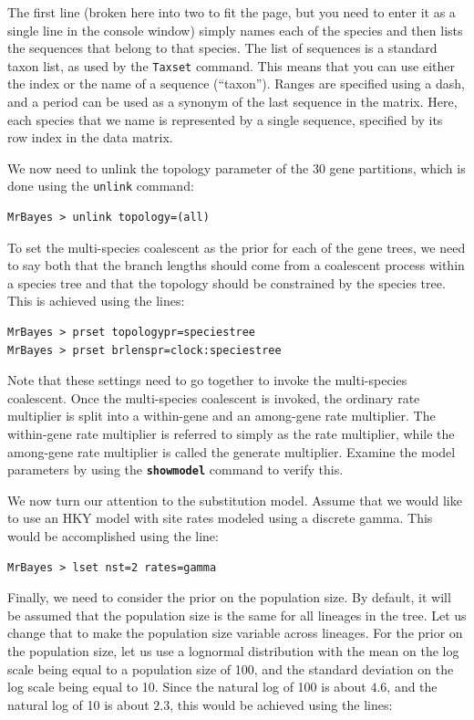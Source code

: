 \documentclass[12pt]{book}
\newcommand{\ttt}[1]{\texttt{#1}}
\newcommand{\tb}[1]{\ttt{\textbf{#1}}}
\begin{document}
The first line (broken here into two to fit the page, but you need to enter it as a single line in
the console window) simply names each of the species and then lists the sequences that belong to
that species. The list of sequences is a standard taxon list, as used by the \ttt{Taxset} command.
This means that you can use either the index or the name of a sequence (``taxon''). Ranges are
specified using a dash, and a period can be used as a synonym of the last sequence in the matrix.
Here, each species that we name is represented by a single sequence, specified by its row index in
the data matrix.

We now need to unlink the topology parameter of the 30 gene partitions, which is done using the
\ttt{unlink} command:

\begin{verbatim}
MrBayes > unlink topology=(all)
\end{verbatim}

To set the multi-species coalescent as the prior for each of the gene trees, we need to say both
that the branch lengths should come from a coalescent process within a species tree and that the
topology should be constrained by the species tree. This is achieved using the lines:

\begin{singlespacing}
\begin{verbatim}
MrBayes > prset topologypr=speciestree
MrBayes > prset brlenspr=clock:speciestree
\end{verbatim}
\end{singlespacing}

Note that these settings need to go together to invoke the multi-species coalescent. Once the
multi-species coalescent is invoked, the ordinary rate multiplier is split into a within-gene and
an among-gene rate multiplier. The within-gene rate multiplier is referred to simply as the rate
multiplier, while the among-gene rate multiplier is called the generate multiplier. Examine the
model parameters by using the \tb{showmodel} command to verify this.

We now turn our attention to the substitution model. Assume that we would like to use an HKY model
with site rates modeled using a discrete gamma. This would be accomplished using the line:

\begin{verbatim}
MrBayes > lset nst=2 rates=gamma
\end{verbatim}

Finally, we need to consider the prior on the population size. By default, it will be assumed that
the population size is the same for all lineages in the tree. Let us change that to make the
population size variable across lineages. For the prior on the population size, let us use a
lognormal distribution with the mean on the log scale being equal to a population size of 100, and
the standard deviation on the log scale being equal to 10. Since the natural log of 100 is about
$4.6$, and the natural log of 10 is about $2.3$, this would be achieved using the lines:
\end{document}
